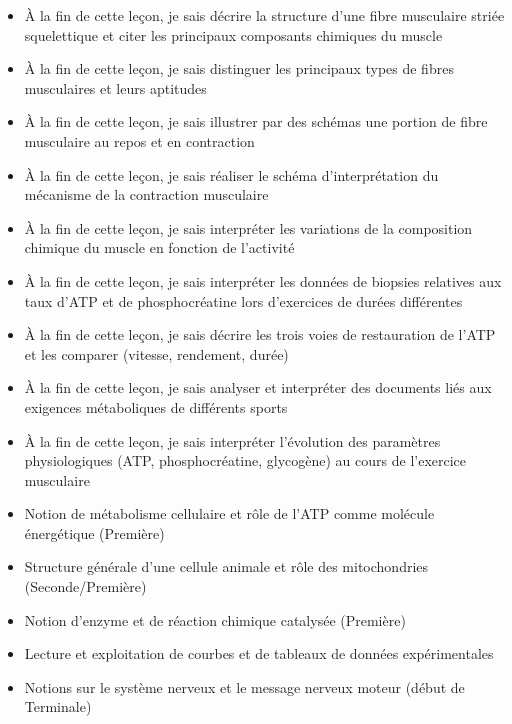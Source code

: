 \documentclass[11pt]{article}
\begin{document}
\begin{objectifs}
\begin{itemize}
\item À la fin de cette leçon, je sais décrire la structure d'une fibre musculaire striée squelettique et citer les principaux composants chimiques du muscle
\item À la fin de cette leçon, je sais distinguer les principaux types de fibres musculaires et leurs aptitudes
\item À la fin de cette leçon, je sais illustrer par des schémas une portion de fibre musculaire au repos et en contraction
\item À la fin de cette leçon, je sais réaliser le schéma d'interprétation du mécanisme de la contraction musculaire
\item À la fin de cette leçon, je sais interpréter les variations de la composition chimique du muscle en fonction de l'activité
\item À la fin de cette leçon, je sais interpréter les données de biopsies relatives aux taux d'ATP et de phosphocréatine lors d'exercices de durées différentes
\item À la fin de cette leçon, je sais décrire les trois voies de restauration de l'ATP et les comparer (vitesse, rendement, durée)
\item À la fin de cette leçon, je sais analyser et interpréter des documents liés aux exigences métaboliques de différents sports
\item À la fin de cette leçon, je sais interpréter l'évolution des paramètres physiologiques (ATP, phosphocréatine, glycogène) au cours de l'exercice musculaire
\end{itemize}
\end{objectifs}

\begin{prerequis}
\begin{itemize}
\item Notion de métabolisme cellulaire et rôle de l'ATP comme molécule énergétique (Première)
\item Structure générale d'une cellule animale et rôle des mitochondries (Seconde/Première)
\item Notion d'enzyme et de réaction chimique catalysée (Première)
\item Lecture et exploitation de courbes et de tableaux de données expérimentales
\item Notions sur le système nerveux et le message nerveux moteur (début de Terminale)
\end{itemize}
\end{prerequis}
\end{document}
